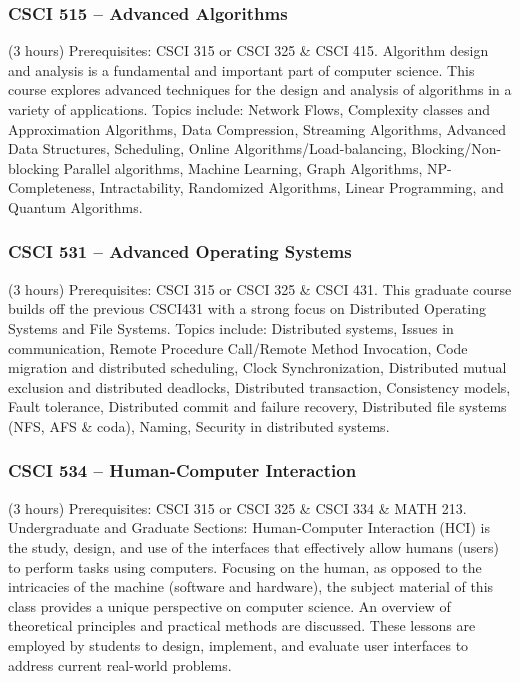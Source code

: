 \subsubsection{CSCI 515 -- Advanced Algorithms}
(3 hours) Prerequisites: CSCI 315 or CSCI 325 \& CSCI 415. Algorithm design and analysis is a fundamental and important part of computer science.   This course explores advanced techniques for the design and analysis of algorithms in a variety of applications.  Topics include: Network Flows, Complexity classes and Approximation Algorithms, Data Compression, Streaming Algorithms, Advanced Data Structures, Scheduling, Online Algorithms/Load-balancing, Blocking/Non-blocking Parallel algorithms, Machine Learning, Graph Algorithms, NP-Completeness, Intractability, Randomized Algorithms, Linear Programming, and Quantum Algorithms.

\subsubsection{CSCI 531 -- Advanced Operating Systems}
(3 hours) Prerequisites: CSCI 315 or CSCI 325 \& CSCI 431. This graduate course builds off the previous CSCI431 with a strong focus on Distributed Operating Systems and File Systems.  Topics include:  Distributed systems, Issues in communication, Remote Procedure Call/Remote Method Invocation, Code migration and distributed scheduling, Clock Synchronization, Distributed mutual exclusion and distributed deadlocks, Distributed transaction, Consistency models, Fault tolerance, Distributed commit and failure recovery, Distributed file systems (NFS, AFS \& coda), Naming, Security in distributed systems.

\subsubsection{CSCI 534 -- Human-Computer Interaction}
(3 hours) Prerequisites: CSCI 315 or CSCI 325 \& CSCI 334 \& MATH 213. Undergraduate and Graduate Sections: Human-Computer Interaction (HCI) is the study, design, and use of the interfaces that effectively allow humans (users) to perform tasks using computers. Focusing on the human, as opposed to the intricacies of the machine (software and hardware), the subject material of this class provides a unique perspective on computer science. An overview of theoretical principles and practical methods are discussed. These lessons are employed by students to design, implement, and evaluate user interfaces to address current real-world problems.

